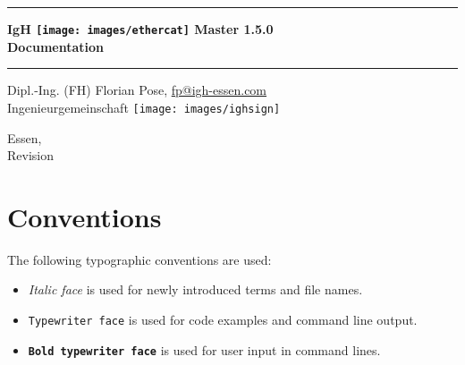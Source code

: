 \documentclass[a4paper,12pt,BCOR6mm,bibtotoc,idxtotoc]{scrbook}
\makeatletter
\renewcommand*{\lstlistoflistings}{%
  \begingroup
    \if@twocolumn
      \@restonecoltrue\onecolumn
    \else
      \@restonecolfalse
    \fi
    \lol@heading
    \setlength{\parskip}{\z@}%
    \setlength{\parindent}{\z@}%
    \setlength{\parfillskip}{\z@ \@plus 1fil}%
    \@starttoc{lol}%
    \if@restonecol\twocolumn\fi
  \endgroup
}
\newcommand{\IgH}{\raisebox{-0.7667ex}
  {\texttt{[image: images/ighsign]}}}
\newcommand{\masterversion}{1.5.0}
\makeatother
\begin{document}
\pagestyle{empty}

\begin{titlepage}
  \begin{center}
    \rule{\textwidth}{1.5mm}

    {\Huge\sf\textbf{IgH \texttt{[image: images/ethercat]}
      Master \masterversion}\\[1ex]
      \textbf{Documentation}}

    \vspace{1ex}
    \rule{\textwidth}{1.5mm}

    \vspace{\fill} {\Large Dipl.-Ing. (FH) Florian Pose,
    \url{fp@igh-essen.com}\\[1ex] Ingenieurgemeinschaft \IgH}

    \vspace{\fill}
    {\Large Essen, \rcsInfoLongDate\\[1ex]
      Revision \rcsInfoRevision}
  \end{center}
\end{titlepage}


\pagestyle{scrplain}

\tableofcontents
\listoftables
\listoffigures


\newpage
\pagestyle{scrheadings}

\section*{Conventions}

The following typographic conventions are used:

\begin{itemize}

\item \textit{Italic face} is used for newly introduced terms and file names.

\item \texttt{Typewriter face} is used for code examples and command line
output.

\item \texttt{\textbf{Bold typewriter face}} is used for user input in command
lines.

\end{itemize}
\end{document}
